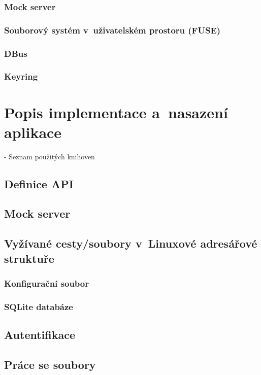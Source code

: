 \subsection{Mock server}

\cite{MockServer}

\subsection{Souborový systém v uživatelském prostoru (FUSE)}
\label{sec:fuse}

\cite{FuseOrNotToFuse}
\cite{HardeningFUSE}

\subsection{DBus}
\subsection{Keyring}

\cite{Keyring}

\chapter{Popis implementace a nasazení aplikace}

- Seznam použitých knihoven

\section{Definice API}
\section{Mock server}
\section{Vyžívané cesty/soubory v Linuxové adresářové struktuře}
\subsection{Konfigurační soubor}
\subsection{SQLite databáze}
\section{Autentifikace}
\section{Práce se soubory}
